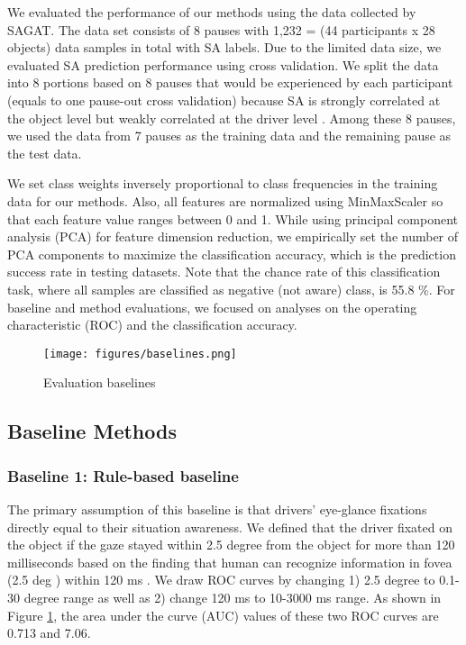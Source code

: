 \documentclass[letterpaper, 10 pt, conference]{ieeeconf}  %
\begin{document}
We evaluated the performance of our methods using the data collected by SAGAT. The data set consists of 8 pauses with 1,232 = (44 participants x 28 objects) data samples in total with SA labels. Due to the limited data size, we evaluated SA prediction performance using cross validation. We split the data into 8 portions based on 8 pauses that would be experienced by each participant (equals to one pause-out cross validation) because SA is strongly correlated at the object level but weakly correlated at the driver level \cite{kim2019toward}. Among these 8 pauses, we used the data from 7 pauses as the training data and the remaining pause as the test data.

We set class weights inversely proportional to class frequencies in the training data for our methods. Also, all features are normalized using MinMaxScaler so that each feature value ranges between 0 and 1. While using principal component analysis (PCA) for feature dimension reduction, we empirically set the number of PCA components to maximize the classification accuracy, which is the prediction success rate in testing datasets. Note that the chance rate of this classification task, where all samples are classified as negative (not aware) class, is 55.8 \%. For baseline and method evaluations, we focused on analyses on the operating characteristic (ROC) and the classification accuracy.

\begin{figure}[!t]
    \centering
    \texttt{[image: figures/baselines.png]}
    \caption{Evaluation baselines}
    \label{fig:baselines}
\vspace{-3mm}
\end{figure}

\subsection{Baseline Methods}

\subsubsection{Baseline 1: Rule-based baseline}

The primary assumption of this baseline is that drivers' eye-glance fixations directly equal to their situation awareness. We defined that the driver fixated on the object if the gaze stayed within 2.5 degree from the object for more than 120 milliseconds based on the finding that human can recognize information in fovea (2.5 deg \cite{quinn2019clinical, nelson1980functional}) within 120 ms \cite{rayner2007eye}. We draw ROC curves by changing 1) 2.5 degree to 0.1-30 degree range as well as 2) change 120 ms to 10-3000 ms range. As shown in Figure \ref{fig:baselines}, the area under the curve (AUC) values of these two ROC curves are  0.713 and 7.06. 
\end{document}
